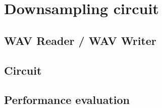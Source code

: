 \chapter{Downsampling circuit}

\section{WAV Reader / WAV Writer}

\section{Circuit}

\section{Performance evaluation}